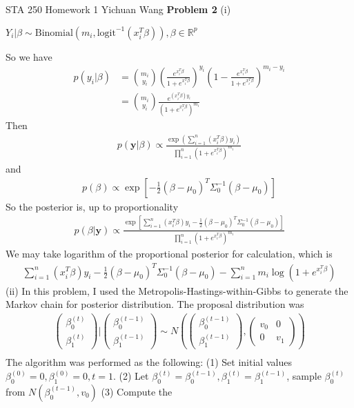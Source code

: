 \documentclass[12pt]{article}
\begin{document}
\noindent STA 250 Homework 1 \newline Yichuan Wang \newline \newline
\textbf{Problem 2} \newline
(i)
\begin{center}
	$Y_i|\beta \sim \text{Binomial}(m_i, \text{logit}^{-1}(x_i^T\beta)), \beta \in \mathbb{R}^p$
\end{center}
So we have
\begin{align*}
	p(y_i|\beta) &= {m_i \choose y_i}(\frac{e^{x_i^T\beta}}{1+e^{x_i^T\beta}})^{y_i}(1 - \frac{e^{x_i^T\beta}}{1+e^{x_i^T\beta}})^{m_i - y_i} \\
	&= {m_i \choose y_i}\frac{e^{(x_i^T\beta)y_i}}{(1+e^{x_i^T\beta})^{m_i}}
\end{align*}
Then
\begin{align*}
	p(\mathbf{y}|\beta) \propto \frac{\exp({\sum_{i=1}^n(x_i^T\beta)y_i})}{\prod_{i=1}^n (1+e^{x_i^T\beta})^{m_i}}
\end{align*}
and
\begin{align*}
	p(\beta) \propto \exp[-\frac{1}{2}(\beta - \mu_0)^T \Sigma_0^{-1} (\beta - \mu_0)]
\end{align*}
So the posterior is, up to proportionality
\begin{align*}
	p(\beta|\mathbf{y}) \propto \frac{\exp[\sum_{i=1}^n(x_i^T\beta)y_i - \frac{1}{2}(\beta - \mu_0)^T \Sigma_0^{-1} (\beta - \mu_0)]}{\prod_{i=1}^n (1+e^{x_i^T\beta})^{m_i}}
\end{align*}
We may take logarithm of the proportional posterior for calculation, which is
\begin{align*}
	\sum_{i=1}^n(x_i^T\beta)y_i - \frac{1}{2}(\beta - \mu_0)^T \Sigma_0^{-1} (\beta - \mu_0) - \sum_{i=1}^n m_i \log(1+e^{x_i^T\beta})
\end{align*}
(ii) In this problem, I used the Metropolis-Hastings-within-Gibbs to generate the Markov chain for posterior distribution. The proposal distribution was
\begin{align*}
	\begin{pmatrix} \beta_0^{(t)} \\ \beta_1^{(t)} \end{pmatrix} | \begin{pmatrix} \beta_0^{(t-1)} \\ \beta_1^{(t-1)} \end{pmatrix} \sim 					N(\begin{pmatrix} \beta_0^{(t-1)} \\ \beta_1^{(t-1)} \end{pmatrix}, \begin{pmatrix} v_0 & 0 \\ 0 & v_1 \end{pmatrix}) \\
\end{align*}
The algorithm was performed as the following: \newline
(1) Set initial values $\beta_0^{(0)} = 0, \beta_1^{(0)} = 0, t = 1$. \newline
(2) Let $\beta_0^{(t)} = \beta_0^{(t-1)}, \beta_1^{(t)} = \beta_1^{(t-1)}$, sample $\beta_0^{(t)}$ from $N(\beta_0^{(t-1)}, v_0)$
(3) Compute the 
\end{document}
